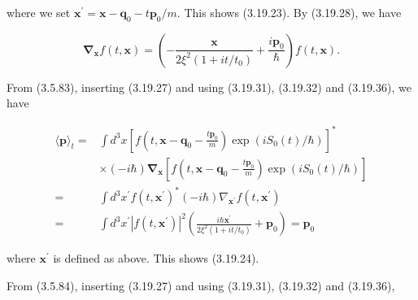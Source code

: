 \documentclass{article}
\begin{document}
where we set $\boldsymbol{x}^{\prime}=\boldsymbol{x}-\boldsymbol{q}_{0}-t \boldsymbol{p}_{0} / m$. This shows (3.19.23).
By (3.19.28), we have
 
\begin{equation*}
\boldsymbol{\nabla}_{\boldsymbol{x}} f(t, \boldsymbol{x})=\left(-\frac{\boldsymbol{x}}{2 \xi^{2}\left(1+i t / t_{0}\right)}+\frac{i \boldsymbol{p}_{0}}{\hbar}\right) f(t, \boldsymbol{x}) . \tag{3.19.36}
\end{equation*}
 

From (3.5.83), inserting (3.19.27) and using (3.19.31), (3.19.32) and (3.19.36), we have
 
\begin{align*}
\langle\boldsymbol{p}\rangle_{t}= & \int d^{3} x\left[f\left(t, \boldsymbol{x}-\boldsymbol{q}_{0}-\frac{t \boldsymbol{p}_{0}}{m}\right) \exp \left(i S_{0}(t) / \hbar\right)\right]^{*}  \tag{3.19.37}\\
& \times(-i \hbar) \boldsymbol{\nabla}_{\boldsymbol{x}}\left[f\left(t, \boldsymbol{x}-\boldsymbol{q}_{0}-\frac{t \boldsymbol{p}_{0}}{m}\right) \exp \left(i S_{0}(t) / \hbar\right)\right] \\
= & \int d^{3} x^{\prime} f\left(t, \boldsymbol{x}^{\prime}\right)^{*}(-i \hbar) \nabla_{\boldsymbol{x}^{\prime}} f\left(t, \boldsymbol{x}^{\prime}\right) \\
= & \int d^{3} x^{\prime}\left|f\left(t, \boldsymbol{x}^{\prime}\right)\right|^{2}\left(\frac{i \hbar \boldsymbol{x}^{\prime}}{2 \xi^{2}\left(1+i t / t_{0}\right)}+\boldsymbol{p}_{0}\right)=\boldsymbol{p}_{0}
\end{align*}
 
where $\boldsymbol{x}^{\prime}$ is defined as above. This shows (3.19.24).

From (3.5.84), inserting (3.19.27) and using (3.19.31), (3.19.32) and (3.19.36),
 
\end{document}
